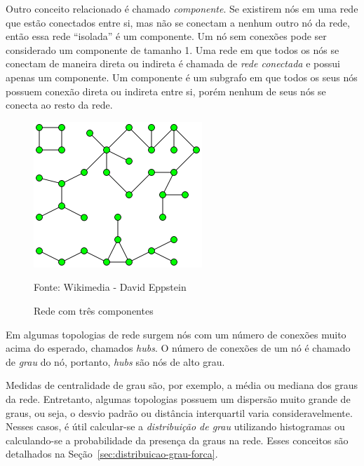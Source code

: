 \documentclass[12pt,a4paper]{article}
\theoremstyle{hypo}
\newcommand{\source}[1]{\vspace{-10pt} \caption*{Fonte: {#1}} }
\begin{document}

Outro conceito relacionado é chamado \textit{componente}. Se existirem nós em uma rede que estão conectados entre si, mas não se conectam a nenhum outro nó da rede, então essa rede \enquote{isolada} é um componente. Um nó sem conexões pode ser considerado um componente de tamanho 1. Uma rede em que todos os nós se conectam de maneira direta ou indireta é chamada de \textit{rede conectada} e possui apenas um componente. Um componente é um subgrafo em que todos os seus nós possuem conexão direta ou indireta entre si, porém nenhum de seus nós se conecta ao resto da rede.


\begin{figure}[ht]
    \centering
    \includegraphics[scale=0.7]{componente.png}
    \caption{Rede com três componentes}
    \source{Wikimedia - David Eppstein}
    \label{fig:exemplo-componente}
\end{figure}

Em algumas topologias de rede surgem nós com um número de conexões muito acima do esperado, chamados \textit{hubs}. O número de conexões de um nó é chamado de \textit{grau} do nó, portanto, \textit{hubs} são nós de alto grau.

Medidas de centralidade de grau são, por exemplo, a média ou mediana dos graus da rede. Entretanto, algumas topologias possuem um dispersão muito grande de graus, ou seja, o desvio padrão ou distância interquartil varia consideravelmente. Nesses casos, é útil calcular-se a \textit{distribuição de grau} utilizando histogramas ou calculando-se a probabilidade da presença da graus na rede. Esses conceitos são detalhados na Seção~\ref{sec:distribuicao-grau-forca}.
\end{document}
